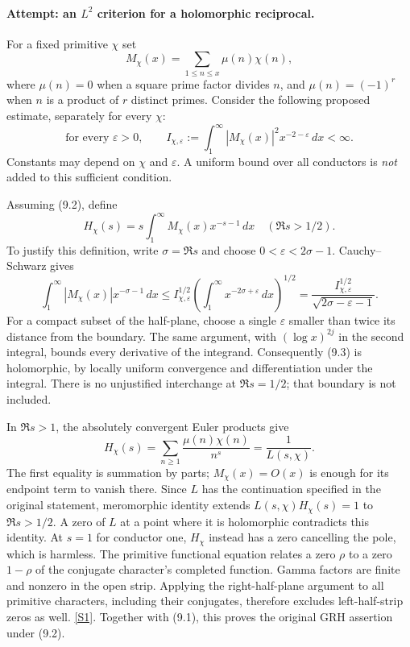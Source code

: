 \documentclass[11pt,a4paper]{article}
\newcommand{\sref}[2]{\hyperlink{source:#1:#2}{[S#2]}}
\begin{document}
\paragraph{Attempt: an $L^2$ criterion for a holomorphic reciprocal.}
For a fixed primitive $\chi$ set
\[
 M_\chi(x)=\sum_{1\leq n\leq x}\mu(n)\chi(n),
\]
where $\mu(n)=0$ when a square prime factor divides $n$, and
$\mu(n)=(-1)^r$ when $n$ is a product of $r$ distinct primes.
Consider the following proposed estimate, separately for every $\chi$:
\[
 \text{for every }\varepsilon>0,\qquad
 I_{\chi,\varepsilon}:=
    \int_1^\infty |M_\chi(x)|^2x^{-2-\varepsilon}\,dx<\infty.
 \tag{9.2}
\]
Constants may depend on $\chi$ and $\varepsilon$. A uniform bound over
all conductors is \emph{not} added to this sufficient condition.

Assuming (9.2), define
\[
 H_\chi(s)=s\int_1^\infty M_\chi(x)x^{-s-1}\,dx
                  \quad(\Re s>1/2). \tag{9.3}
\]
To justify this definition, write $\sigma=\Re s$ and choose
$0<\varepsilon<2\sigma-1$. Cauchy--Schwarz gives
\[
 \int_1^\infty |M_\chi(x)|x^{-\sigma-1}\,dx
 \leq I_{\chi,\varepsilon}^{1/2}
       \left(\int_1^\infty x^{-2\sigma+\varepsilon}\,dx\right)^{1/2}
 =\frac{I_{\chi,\varepsilon}^{1/2}}{
                    \sqrt{2\sigma-\varepsilon-1}}. \tag{9.4}
\]
For a compact subset of the half-plane, choose a single $\varepsilon$
smaller than twice its distance from the boundary. The same argument,
with $(\log x)^{2j}$ in the second integral, bounds every derivative of
the integrand. Consequently (9.3) is holomorphic, by locally uniform
convergence and differentiation under the integral. There is no
unjustified interchange at $\Re s=1/2$; that boundary is not included.

In $\Re s>1$, the absolutely convergent Euler products give
\[
 H_\chi(s)=\sum_{n\geq1}\frac{\mu(n)\chi(n)}{n^s}
          =\frac1{L(s,\chi)}. \tag{9.5}
\]
The first equality is summation by parts; $M_\chi(x)=O(x)$ is enough
for its endpoint term to vanish there. Since $L$ has the continuation
specified in the original statement, meromorphic identity extends
$L(s,\chi)H_\chi(s)=1$ to $\Re s>1/2$. A zero of $L$ at a point where
it is holomorphic contradicts this identity. At $s=1$ for conductor one,
$H_\chi$ instead has a zero cancelling the pole, which is harmless.
The primitive functional equation relates a zero $\rho$ to a zero
$1-\rho$ of the conjugate character's completed function. Gamma factors
are finite and nonzero in the open strip. Applying the right-half-plane
argument to all primitive characters, including their conjugates,
therefore excludes left-half-strip zeros as well. \sref{30006676}{1}.
Together with (9.1), this proves the original GRH assertion under (9.2).
\end{document}
